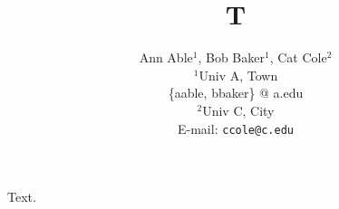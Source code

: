 \documentclass{article}
\title{T}
\author{Ann Able$^1$, Bob Baker$^1$, Cat Cole$^{2}$\\
\scriptsize{$^1$Univ A, Town}\\
\scriptsize{\{aable, bbaker\} @ a.edu}\\
\scriptsize{$^2$Univ C, City}\\
\scriptsize{E-mail: \texttt{ccole@c.edu}}}
\date{}
\begin{document}
\maketitle
Text.
\end{document}
